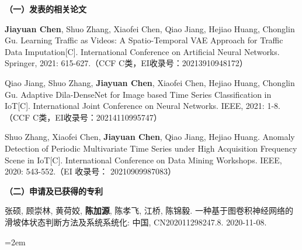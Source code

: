 \begin{publication}
\noindent\textbf{（一）发表的相关论文}
\begin{publist}
\item \textbf{Jiayuan Chen}, Shuo Zhang, Xiaofei Chen, Qiao Jiang, Hejiao Huang, Chonglin Gu. Learning Traffic as Videos: A Spatio-Temporal VAE Approach for Traffic Data Imputation[C]. International Conference on Artificial Neural Networks. Springer, 2021: 615-627.（CCF C类，EI收录号：20213910948172）
\item Qiao Jiang, Shuo Zhang, \textbf{Jiayuan Chen}, Xiaofei Chen, Hejiao Huang, Chonglin Gu. Adaptive Dila-DenseNet for Image based Time Series Classification in IoT[C]. International Joint Conference on Neural Networks. IEEE, 2021: 1-8.（CCF C类，EI收录号：20214110995747）
\item Shuo Zhang, Xiaofei Chen, \textbf{Jiayuan Chen}, Qiao Jiang, Hejiao Huang. Anomaly Detection of Periodic Multivariate Time Series under High Acquisition Frequency Scene in IoT[C]. International Conference on Data Mining Workshops. IEEE, 2020: 543-552.（EI 收录号： 20210909987083）
\end{publist}
\noindent\textbf{（二）申请及已获得的专利}
\begin{publist}
\item 张硕, 顾崇林, 黄荷姣, \textbf{陈加源}, 陈孝飞, 江桥, 陈锦毅. 一种基于图卷积神经网络的滑坡体状态判断方法及系统系统化: 中国, CN202011298247.8. 2020-11-08.
\end{publist}

\vfill
{}\hangindent=2em\noindent
\setlength{\parindent}{2em}
\end{publication}
